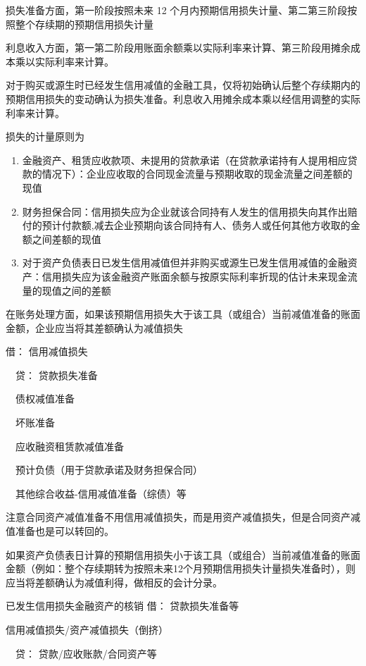 \documentclass[UTF8,12pt]{ctexart}
\newenvironment{Dr}{\noindent 借：}{\par}
\newenvironment{Cr}{\noindent \ \ 贷：}{\par}
\numberwithin{equation}{section} %
\numberwithin{figure}{section}
\numberwithin{table}{section}
\begin{document}
	损失准备方面，第一阶段按照未来 12 个月内预期信用损失计量、第二第三阶段按照整个存续期的预期信用损失计量
	
	利息收入方面，第一第二阶段用账面余额乘以实际利率来计算、第三阶段用摊余成本乘以实际利率来计算。
	
	对于购买或源生时已经发生信用减值的金融工具，仅将初始确认后整个存续期内的预期信用损失的变动确认为损失准备。利息收入用摊余成本乘以经信用调整的实际利率来计算。
	
	损失的计量原则为
	\begin{enumerate}
		\item 金融资产、租赁应收款项、未提用的贷款承诺（在贷款承诺持有人提用相应贷款的情况下）：企业应收取的合同现金流量与预期收取的现金流量之间差额的现值
		
		\item 财务担保合同：信用损失应为企业就该合同持有人发生的信用损失向其作出赔付的预计付款额,减去企业预期向该合同持有人、债务人或任何其他方收取的金额之间差额的现值
		
		\item 对于资产负债表日已发生信用减值但并非购买或源生已发生信用减值的金融资产：信用损失应为该金融资产账面余额与按原实际利率折现的估计未来现金流量的现值之间的差额
		
	\end{enumerate}

	在账务处理方面，如果该预期信用损失大于该工具（或组合）当前减值准备的账面金额，企业应当将其差额确认为减值损失
	
	\begin{Dr}
		信用减值损失
	\end{Dr}
	\begin{Cr}
		贷款损失准备
		
		\ \ 债权减值准备
		
		\ \ 坏账准备
		
		\ \ 应收融资租赁款减值准备
		
		\ \ 预计负债（用于贷款承诺及财务担保合同）
		
		\ \ 其他综合收益-信用减值准备（综债）等
	\end{Cr}

	注意合同资产减值准备不用信用减值损失，而是用资产减值损失，但是合同资产减值准备也是可以转回的。
	
	如果资产负债表日计算的预期信用损失小于该工具（或组合）当前减值准备的账面金额（例如：整个存续期转为按照未来12个月预期信用损失计量损失准备时），则应当将差额确认为减值利得，做相反的会计分录。
	
	已发生信用损失金融资产的核销
	\begin{Dr}
		贷款损失准备等
		
		信用减值损失/资产减值损失（倒挤）
	\end{Dr}
	\begin{Cr}
		贷款/应收账款/合同资产等
	\end{Cr}
	
\end{document}
